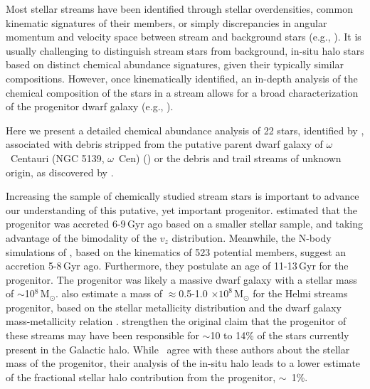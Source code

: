 \documentclass[twocolumn]{aastex63}
\begin{document}
Most stellar streams have been identified through stellar overdensities, common kinematic signatures of their members, or simply discrepancies in angular momentum and velocity space between stream and background stars (e.g., \citealt{Helmi06, grillmair08, malhan18, shipp18}).
It is usually challenging to distinguish stream stars from background, in-situ halo stars based on distinct chemical abundance signatures, given their typically similar compositions.
However, once kinematically identified, an in-depth analysis of the chemical composition of the stars in a stream allows for a broad characterization of the progenitor dwarf galaxy (e.g., \citealt{casey13, ji20}).

Here we present a detailed chemical abundance analysis of 22 stars, identified by \citet{beers17}, associated with debris stripped from the putative parent dwarf galaxy of $\omega$~Centauri (NGC 5139, $\omega$~Cen) (\citealt{dinescu02,klement09,majewski12}) or the debris and trail streams of unknown origin, as discovered by \citet{Helmi99b}. 



Increasing the sample of chemically studied stream stars is important to advance our understanding of this putative, yet important progenitor. \citet{Kepley07} estimated that the progenitor was accreted 6-9\,Gyr ago based on a smaller stellar sample, and taking advantage of the bimodality of the $v_{z}$ distribution. Meanwhile, the N-body simulations of \citet{koppelman19}, based on the kinematics of 523 potential members, suggest an accretion 5-8\,Gyr ago. Furthermore, they postulate an age of 11-13\,Gyr for the progenitor. The progenitor was likely a massive dwarf galaxy with a stellar mass of $\sim$10$^8$\,M$_{\odot}$. 
\citet{naidu20} also estimate a mass of $\approx$0.5-1.0 $\times 10^{8}$\,M$_{\odot}$ for the Helmi streams progenitor, based on the stellar metallicity distribution and the dwarf galaxy mass-metallicity relation \citep{Kirby13b}.
\citet{koppelman19} strengthen the original \citet{Helmi99a} claim that the progenitor of these streams may have been responsible for $\sim$10 to 14\% of the stars currently present in the Galactic halo.
While \citeauthor{naidu20}\ agree with these authors about the stellar mass of the progenitor, their analysis of the in-situ halo leads to a lower estimate of the fractional stellar halo contribution from the progenitor, $\sim$~1\%.
\end{document}
